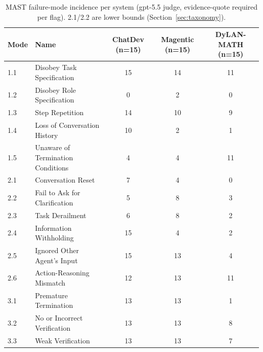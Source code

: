 \begin{table}[h]\centering\small
\begin{tabular}{llccc}\toprule
Mode & Name & ChatDev (n=15) & Magentic (n=15) & DyLAN-MATH (n=15)\\
\midrule
1.1 & Disobey Task Specification & 15 & 14 & 11\\
1.2 & Disobey Role Specification & 0 & 2 & 0\\
1.3 & Step Repetition & 14 & 10 & 9\\
1.4 & Loss of Conversation History & 10 & 2 & 1\\
1.5 & Unaware of Termination Conditions & 4 & 4 & 11\\
2.1 & Conversation Reset & 7 & 4 & 0\\
2.2 & Fail to Ask for Clarification & 5 & 8 & 3\\
2.3 & Task Derailment & 6 & 8 & 2\\
2.4 & Information Withholding & 15 & 4 & 2\\
2.5 & Ignored Other Agent's Input & 15 & 13 & 4\\
2.6 & Action-Reasoning Mismatch & 12 & 13 & 11\\
3.1 & Premature Termination & 13 & 13 & 1\\
3.2 & No or Incorrect Verification & 13 & 13 & 8\\
3.3 & Weak Verification & 13 & 13 & 7\\
\bottomrule\end{tabular}
\caption{MAST failure-mode incidence per system (gpt-5.5 judge, evidence-quote required per flag). 2.1/2.2 are lower bounds (Section~\ref{sec:taxonomy}).}\label{tab:modes}
\end{table}
